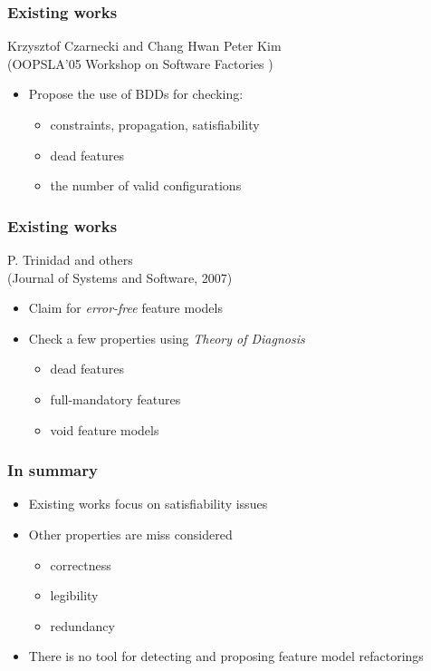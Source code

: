 \documentclass{beamer}
\begin{document}
\begin{frame}

\frametitle{Existing works}

Krzysztof Czarnecki and Chang Hwan Peter Kim \\ (OOPSLA'05 Workshop on Software Factories )

\begin{itemize}
\item Propose the use of BDDs for checking:
\begin{itemize}
\item constraints, propagation, satisfiability
\item dead features
\item the number of valid configurations
\end{itemize}
\end{itemize}

\end{frame}

\begin{frame}

\frametitle{Existing works}

P. Trinidad and others \\ (Journal of Systems and Software, 2007)

\begin{itemize}
\item Claim for \emph{error-free} feature models
\item Check a few properties using \emph{Theory of Diagnosis} 
\begin{itemize}
 \item dead features
 \item full-mandatory features
 \item void feature models 
\end{itemize}
\end{itemize}

\end{frame}


\begin{frame}
\frametitle{In summary}

\begin{itemize}
\item Existing works focus on satisfiability issues
\item Other properties are miss considered

\begin{itemize}
 \item correctness
  \item legibility
  \item redundancy
 \end{itemize} 
\item There is no tool for detecting and proposing feature model refactorings

\end{itemize}

\end{frame}
\end{document}
